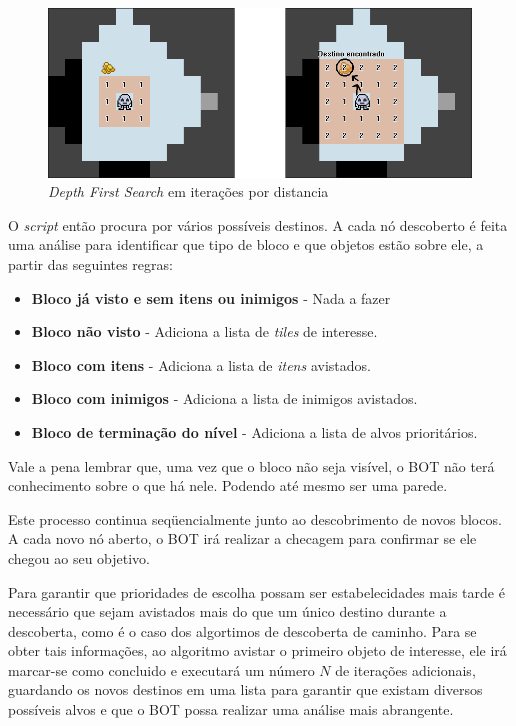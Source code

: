 \begin{figure}[h]
	\centering
	\label{fig11}
		\includegraphics[keepaspectratio=true,scale=0.5]{figuras/fig11-dfs.png}
	\caption{\textit{Depth First Search} em iterações por distancia}
\end{figure}

O \textit{script} então procura por vários possíveis destinos. A cada nó descoberto é feita uma análise para identificar que tipo de bloco e que objetos estão sobre ele, a partir das seguintes regras:
\begin{itemize}
	\item \textbf{Bloco já visto e sem itens ou inimigos} - Nada a fazer
	\item \textbf{Bloco não visto} - Adiciona a lista de \textit{tiles} de interesse.
	\item \textbf{Bloco com itens} - Adiciona a lista de \textit{itens} avistados.
	\item \textbf{Bloco com inimigos} - Adiciona a lista de inimigos avistados.
	\item \textbf{Bloco de terminação do nível} - Adiciona a lista de alvos prioritários. 
\end{itemize}

Vale a pena lembrar que, uma vez que o bloco não seja visível, o BOT não terá conhecimento sobre o que há nele. Podendo até mesmo ser uma parede. 

Este processo continua seqüencialmente junto ao descobrimento de novos blocos. A cada novo nó aberto, o BOT irá realizar a checagem para confirmar se ele chegou ao seu objetivo. 

Para garantir que prioridades de escolha possam ser estabelecidades mais tarde é necessário que sejam avistados mais do que um único destino durante a descoberta, como é o caso dos algortimos de descoberta de caminho. Para se obter tais informações, ao algoritmo avistar o primeiro objeto de interesse, ele irá marcar-se como concluido e executará um número $N$ de iterações adicionais, guardando os novos destinos em uma lista para garantir que existam diversos possíveis alvos e que o BOT possa realizar uma análise mais abrangente. 

